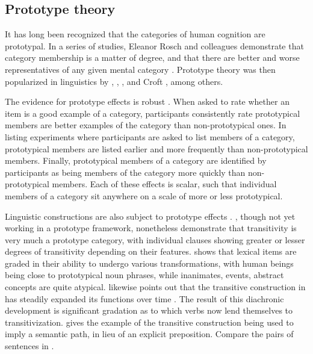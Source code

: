 \subsection{Prototype theory}
\label{sec:2.4.1}

It has long been recognized that the categories of human cognition are prototypal. In a series of studies, Eleanor Rosch and colleagues demonstrate that category membership is a matter of degree, and that there are better and worse representatives of any given mental category \parencites{Rosch1973a}{Rosch1973b}{Rosch1975}{RoschMervis1975}{Roschetal1976}{Rosch1978}. Prototype theory was then popularized in linguistics by \textcite{Lakoff1987}, \textcite{Langacker1987}, \citeauthor{Taylor2003} , and Croft , among others.

The evidence for prototype effects is robust \parencite[46--47]{Taylor2003}. When asked to rate whether an item is a good example of a category, participants consistently rate prototypical members are better examples of the category than non-prototypical ones. In listing experiments where participants are asked to list members of a category, prototypical members are listed earlier and more frequently than non-prototypical members. Finally, prototypical members of a category are identified by participants as being members of the category more quickly than non-prototypical members. Each of these effects is scalar, such that individual members of a category sit anywhere on a scale of more or less prototypical.

Linguistic constructions are also subject to prototype effects \parencite[Ch.~12]{Taylor2003}. \textcite{HopperThompson1980}, though not yet working in a prototype framework, nonetheless demonstrate that transitivity is very much a prototype category, with individual clauses showing greater or lesser degrees of transitivity depending on their features. \textcite{Ross1972} shows that lexical items are graded in their ability to undergo various transformations, with human beings being close to prototypical noun phrases, while inanimates, events, abstract concepts are quite atypical. \textcite[§12.5]{Taylor2003} likewise points out that the transitive construction in  has steadily expanded its functions over time . The result of this diachronic development is significant gradation as to which verbs now lend themselves to transitivization. \textcite[236]{Taylor2003} gives the example of the transitive construction being used to imply a semantic path, in lieu of an explicit preposition. Compare the pairs of  sentences in .

